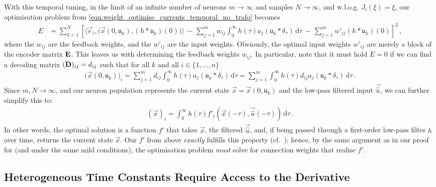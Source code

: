 With this temporal tuning, in the limit of an infinite number of neurons $m \to \infty$ and samples $N \to \infty$, and w.l.o.g. $J_i(\xi) = \xi$, our optimisation problem from \cref{eqn:weight_optimise_currents_temporal_no_trafo} becomes
\begin{align*}
	E &= \sum_{k = 1}^N \left[
			\bigl\langle \vec e_i, \bigl(\vec x(0, \mathfrak{u}_k), (h \ast \mathfrak{u}_k)(0) \bigr) \bigr\rangle \,-\,
			\sum_{j = 1}^m w_{ij} \! \int_0^\infty \!\!\! h(\tau) a_j(\mathfrak{u}_k \ast \delta_\tau) \,\mathrm{d}\tau \,-\,
			\sum_{j = 1}^m w'_{ij} (h \ast \mathfrak{u}_k)(0)
		\right]^2 \,,
\end{align*}
where the $w_{ij}$ are the feedback weights, and the $w'_{ij}$ are the input weights.
Obviously, the optimal input weights $w'_{ij}$ are merely a block of the encoder matrix $\mathbf{E}$.
This leaves us with determining the feedback weights $w_{ij}$.
In particular, note that it must hold $E = 0$ if we can find a decoding matrix $(\mathbf{D})_{ij} = d_{ij}$ such that for all $k$ and all $i \in \{1, \ldots, n\}$
\begin{align*}
	\bigl(\vec x(0, \mathfrak{u}_k)\bigr)_i = \sum_{j = 1}^m d_{ij} \! \int_0^\infty \!\!\! h(\tau) a_j(\mathfrak{u}_k \ast \delta_\tau) \,\mathrm{d}\tau = \sum_{j = 1}^m \! \int_0^\infty \!\!\! h(\tau) d_{ij} a_j(\mathfrak{u}_k \ast \delta_\tau) \,\mathrm{d}\tau \,.
\end{align*}
Since $m, N \to \infty$, and our neuron population represents the current state $\vec x = \vec x(0, \mathfrak{u}_k)$ and the low-pass filtered input $\vec{\hat u}$, we can further simplify this to:
\begin{align*}
	(\vec x )_i = \int_0^\infty \!\!\! h(\tau) f'_i(\vec x(-\tau), \vec{\hat u}(-\tau)) \,\mathrm{d}\tau \,.
\end{align*}
In other words, the optimal solution is a function $f'$ that takes $\vec x$, the filtered $\vec{\hat u}$, and, if being passed through a first-order low-pass filter $h$ over time, returns the current state $\vec x$.
Our $f'$ from above \emph{exactly} fulfills this property (cf.~); hence, by the same argument as in our proof for  (and under the same mild conditions), the optimisation problem \emph{must} solve for connection weights that realise $f'$.

\clearpage

\subsection{Heterogeneous Time Constants Require Access to the Derivative}
\label{app:heterogenous_time_constants}

